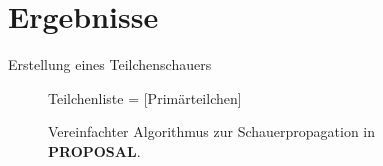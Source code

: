 \documentclass[aspectratio=1610, captions=tableheading, 11pt]{beamer}
\begin{document}
\section{Ergebnisse}

\begin{frame}{Erstellung eines Teilchenschauers}
\begin{center}
\begin{minipage}{0.7\textwidth}
\begin{figure}
\begin{algorithm}[H] %
\DontPrintSemicolon
     \SetAlgoLined
    Teilchenliste = [Primärteilchen]\;

\end{algorithm}
\caption*{Vereinfachter Algorithmus zur Schauerpropagation in \textbf{PROPOSAL}.}
\end{figure}
\end{minipage}
\end{center}
\end{frame}
\end{document}
